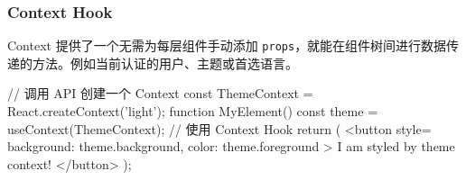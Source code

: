 \subsubsection{Context Hook}

Context 提供了一个无需为每层组件手动添加 \texttt{props}，就能在组件树间进行数据传递的方法。例如当前认证的用户、主题或首选语言。

\begin{JavaScript}
// 调用 API 创建一个 Context
const ThemeContext = React.createContext('light');
function MyElement() {
  const theme = useContext(ThemeContext); // 使用 Context Hook
  return (
    <button style={{ background: theme.background, color: theme.foreground }}>
      I am styled by theme context!
    </button>
  );
}
\end{JavaScript}

